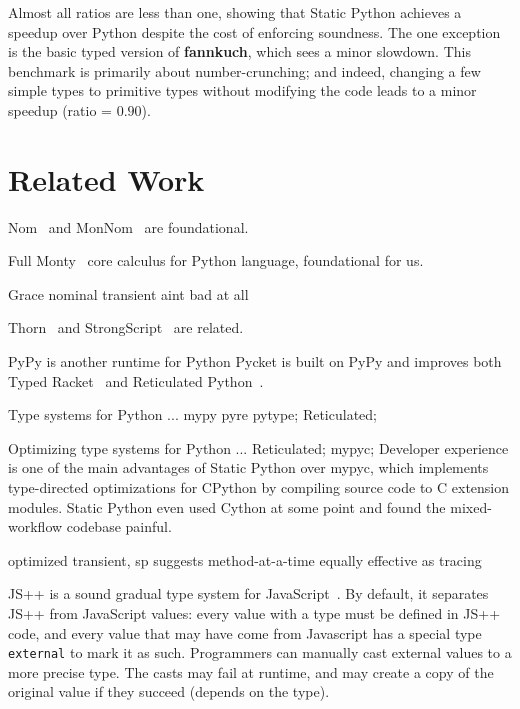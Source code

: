 \documentclass[english,cleveref,submission]{programming}
\newcommand{\SP}{Static Python}
\newcommand{\code}[1]{\texttt{#1}}
\newcommand{\bmname}[1]{\textbf{#1}}
\begin{document}
Almost all ratios are less than one, showing that \SP{} achieves a speedup over
Python despite the cost of enforcing soundness.
The one exception is the basic typed version of \bmname{fannkuch}, which sees a minor
slowdown.
This benchmark is primarily about number-crunching; and indeed, changing a few simple
types to primitive types without modifying the code leads to a minor speedup (ratio = $0.90$).


\section{Related Work}
\label{s:related}

Nom~\cite{mt-oopsla-2017} and MonNom~\cite{mt-oopsla-2021} are foundational.

Full Monty~\cite{pmmwplck-oopsla-2013} core calculus for Python language, foundational for us.

Grace nominal transient aint bad at all

Thorn~\cite{wnlov-popl-2010} and StrongScript~\cite{rzv-ecoop-2015} are related.

PyPy is another runtime for Python
Pycket is built on PyPy and improves both Typed Racket~\cite{bbst-oopsla-2017}
and Reticulated Python~\cite{vsc-dls-2019}.

Type systems for Python ...
mypy pyre pytype;
Reticulated;

Optimizing type systems for Python ...
Reticulated;
mypyc;
Developer experience is one of the main advantages of \SP{} over mypyc,
which implements type-directed optimizations for CPython
by compiling source code to C extension modules.
\SP{} even used Cython at some point and found the mixed-workflow codebase painful.

optimized transient, sp suggests method-at-a-time equally effective as tracing

JS++ is a sound gradual type system for JavaScript~\cite{jspp}.
By default, it separates JS++ from JavaScript values:
every value with a type must be defined in JS++ code,
and every value that may have come from Javascript has
a special type \code{external} to mark it as such.
Programmers can manually cast external values to a
more precise type.
The casts may fail at runtime, and may create a copy of
the original value if they succeed (depends on the type).
\end{document}
